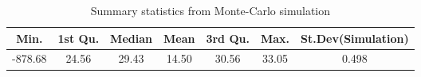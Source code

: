\begin{table}[!htbp]
\centering
\begin{tabular}{@{}ccccccc@{}}
\toprule
Min.       & 1st Qu. & Median & Mean  & 3rd Qu. & Max.    & St.Dev(Simulation)  \\ \midrule
-878.68 & 24.56   & 29.43  & 14.50 & 30.56   & 33.05 & 0.498 \\ \bottomrule
\end{tabular}
\caption{Summary statistics from Monte-Carlo simulation}
\label{tab:prob5-summary}
\end{table}
